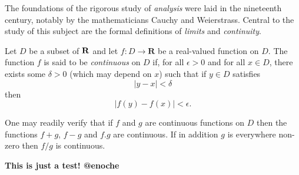 \documentclass[a4paper,12pt]{article}
\begin{document}
The foundations of the rigorous study of \emph{analysis}
were laid in the nineteenth century, notably by the
mathematicians Cauchy and Weierstrass. Central to the
study of this subject are the formal definitions of
\emph{limits} and \emph{continuity}.

Let $D$ be a subset of $\bf R$ and let
$f \colon D \to \mathbf{R}$ be a real-valued function on
$D$. The function $f$ is said to be \emph{continuous} on
$D$ if, for all $\epsilon > 0$ and for all $x \in D$,
there exists some $\delta > 0$ (which may depend on $x$)
such that if $y \in D$ satisfies
\[ |y - x| < \delta \]
then
\[ |f(y) - f(x)| < \epsilon. \]

One may readily verify that if $f$ and $g$ are continuous
functions on $D$ then the functions $f+g$, $f-g$ and
$f.g$ are continuous. If in addition $g$ is everywhere
non-zero then $f/g$ is continuous.

\textbf{This is just a test! @enoche}
\end{document}
